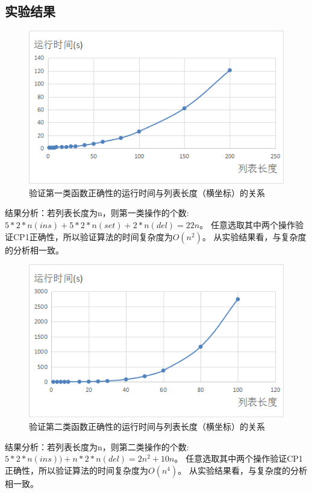 \subsection{实验结果}
\begin{figure}[H]
\centering
\includegraphics{figures/runtime1.bmp}
\caption{验证第一类函数正确性的运行时间与列表长度（横坐标）的关系}
\end{figure}
\par 结果分析：若列表长度为n，则第一类操作的个数:$5*2*n(ins)+5*2*n(set)+2*n(del) = 22n$。
任意选取其中两个操作验证CP1正确性，所以验证算法的时间复杂度为$O(n^2)$。
从实验结果看，与复杂度的分析相一致。

\begin{figure}[H]
\centering
\includegraphics{figures/runtime2.bmp}
\caption{验证第二类函数正确性的运行时间与列表长度（横坐标）的关系}
\end{figure}
\par 结果分析：若列表长度为n，则第二类操作的个数:$5*2*n(ins))+n*2*n(del) = 2n^2+10n$。
任意选取其中两个操作验证CP1正确性，所以验证算法的时间复杂度为$O(n^4)$。
从实验结果看，与复杂度的分析相一致。

